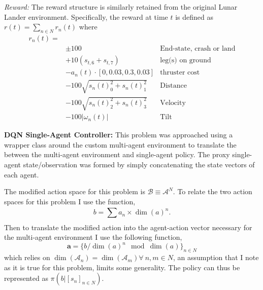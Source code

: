 \documentclass[12pt,letterpaper]{exam}
\begin{document}
\begin{questions}
	\emph{Reward:} The reward structure is similarly retained from 
	the original Lunar Lander environment. Specifically, the reward
	at time \(t\) is defined as
	\(r(t) = \sum_{n\in N} r_n(t)\)
	where
	\begin{align*}
        r_n(t) = \\
        & \pm 100                   & \text{End-state, crash or land} \\
        & +10 (s_{t,6} + s_{t,7})   & \text{leg(s) on ground} \\
        & -a_n(t)\cdot [0,0.03,0.3,0.03] & \text{thruster cost} \\
        & - 100\sqrt{s_{n}(t)_0^2+s_{n}(t)_1^2} & \text{Distance} \\
        & - 100\sqrt{s_{n}(t)_2^2+s_{n}(t)_3^2} & \text{Velocity} \\
        & - 100|\omega_n(t)| & \text{Tilt}
    \end{align*}


    \question \textbf{DQN Single-Agent Controller:}
    This problem was approached using a wrapper class around the
    custom multi-agent environment to translate the between the 
    multi-agent environment and single-agent policy. 
    The proxy single-agent state/observation was formed by simply 
    concatenating the state vectors of each agent.

    The modified action space for this problem is
    \(\mathcal{B} \equiv \mathcal{A}^N\).
    To relate the two action spaces for this problem I use the function,
    \[ b = \sum_{}^{} a_n \times \dim(a)^n. \]
    Then to translate the modified action into the agent-action vector 
    necessary for the multi-agent environment I use the following function,
    \[ \mathbf{a} = \{b/\dim(a)^n \mod\dim(a) \}_{n\in N} \] which 
    relies on \(\dim(\mathcal{A}_n)=\dim(\mathcal{A}_m)\forall\ n,m\in N\),
    an assumption that I note as it is true for this problem, 
    limits some generality.
    The policy can thus be represented as \(\pi(b \big| [s_n]_{n\in N})\).


\end{questions}
\end{document}
